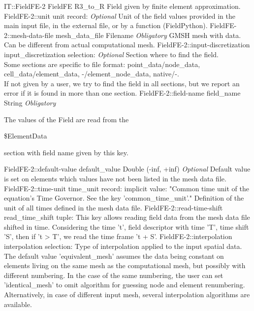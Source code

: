 \begin{RecordType}
	{IT::FieldFE-2}
	{FieldFE}
	{}%
	{}%
	{{{R3{\_}to{\_}R Field given by finite element approximation.}%
}}
		\RecKey
			{FieldFE-2::unit}
			{unit}
			{{record: }}{}
			{ \it{Optional}}
			{{{Unit of the field values provided in the main input file, in the external file, or by a function (FieldPython).}%
}}
		\RecKey
			{FieldFE-2::mesh-data-file}
			{mesh{\_}data{\_}file}
			{{Filename}}{}
			{ \it{Obligatory}}
			{{{GMSH mesh with data.
Can be different from actual computational mesh.}%
}}
		\RecKey
			{FieldFE-2::input-discretization}
			{input{\_}discretization}
			{{selection: }}{}
			{ \it{Optional}}
			{{{Section where to find the field.}\\{
 Some sections are specific to file format: point{\_}data/node{\_}data, cell{\_}data/element{\_}data, -/element{\_}node{\_}data, native/-.}\\{
If not given by a user, we try to find the field in all sections, but we report an error if it is found in more than one section.}%
}}
		\RecKey
			{FieldFE-2::field-name}
			{field{\_}name}
			{{String}}{}
			{ \it{Obligatory}}
			{{{The values of the Field are read from the }\begin{ttfamily}{\$}ElementData\end{ttfamily}{ section with field name given by this key.}%
}}
		\RecKey
			{FieldFE-2::default-value}
			{default{\_}value}
			{{Double (-inf, +inf)}}{}
			{ \it{Optional}}
			{{{Default value is set on elements which values have not been listed in the mesh data file.}%
}}
		\RecKey
			{FieldFE-2::time-unit}
			{time{\_}unit}
			{{record: }}{}
			{implicit value: "{Common time unit of the equation's Time Governor.
See the key 'common{\_}time{\_}unit'.}"}
			{{{Definition of the unit of all times defined in the mesh data file.}%
}}
		\RecKey
			{FieldFE-2::read-time-shift}
			{read{\_}time{\_}shift}
			{{tuple: }}{}
			{ }
			{{{This key allows reading field data from the mesh data file shifted in time.
Considering the time 't', field descriptor with time 'T', time shift 'S', then if 't {\textgreater} T', we read the time frame 't + S'.}%
}}
		\RecKey
			{FieldFE-2::interpolation}
			{interpolation}
			{{selection: }}{}
			{ }
			{{{Type of interpolation applied to the input spatial data.}\\{
The default value 'equivalent{\_}mesh' assumes the data being constant on elements living on the same mesh as the computational mesh, but possibly with different numbering.
In the case of the same numbering, the user can set 'identical{\_}mesh' to omit algorithm for guessing node and element renumbering.
Alternatively, in case of different input mesh, several interpolation algorithms are available.}%
}}
\end{RecordType}
